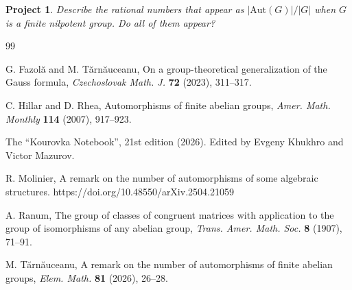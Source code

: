 \documentclass[12pt]{amsart}
\newtheorem{proj}{Project}
\begin{document}
\begin{proj}
Describe the rational numbers that appear as $|\mathrm{Aut}(G)|/|G|$ when $G$ is a finite nilpotent group.  Do all of them appear?
\end{proj}

\begin{thebibliography}{99}

 G. Fazol\u{a} and M. T\u{a}rn\u{a}uceanu, On a group-theoretical generalization of the Gauss formula, {\it Czechoslovak Math. J.} {\bf 72} (2023), 311--317.

 C. Hillar and D. Rhea, Automorphisms of finite abelian groups, {\it Amer. Math. Monthly} {\bf 114} (2007), 917--923.
	
 The ``Kourovka Notebook'', 21st edition (2026). Edited by Evgeny Khukhro and Victor Mazurov.

 R. Molinier, A remark on the number of automorphisms of some algebraic structures.   	
https://doi.org/10.48550/arXiv.2504.21059


 A. Ranum, The group of classes of congruent matrices with application to the group of isomorphisms of any abelian group, {\it Trans. Amer. Math. Soc.} {\bf 8} (1907), 71--91. 

 M. T\u{a}rn\u{a}uceanu, A remark on the number of automorphisms of finite abelian groups, {\it Elem. Math.} {\bf 81} (2026), 26--28. 

\end{thebibliography}
\end{document}
